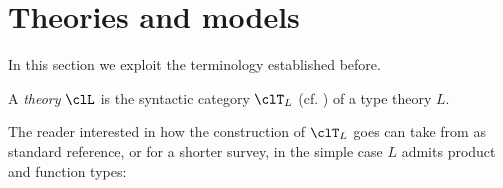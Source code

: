 \section{Theories and models}
\label{sec:orge02f333}
In this section we exploit the terminology established before.
\begin{definition}[Theory]\label{teoria}
	A \emph{theory} $\clL$ is the syntactic category $\clT_L$ (cf. \cite{lambek1988introduction}) of a type theory $L$.
\end{definition}
The reader interested in how the construction of $\clT_L$ goes can take from \cite{lambek1988introduction} as standard reference, or \cite{abramskyno} for a shorter survey, in the simple case $L$ admits product and function types:


